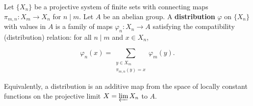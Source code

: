Let $\{X_n\}$ be a projective system of finite sets with connecting maps
$\pi_{m,n}: X_m \to X_n$ for $n \mid m$. Let $A$ be an abelian group.
A \textbf{distribution} $\varphi$ on $\{X_n\}$ with values in $A$ is a family of
maps $\varphi_n: X_n \to A$ satisfying the compatibility (distribution) relation:
for all $n \mid m$ and $x \in X_n$,

$$\varphi_n(x) = \sum_{\substack{y \in X_m \\ \pi_{m,n}(y) = x}} \varphi_m(y).$$

Equivalently, a distribution is an additive map from the space of locally constant
functions on the projective limit $X = \varprojlim X_n$ to $A$.
